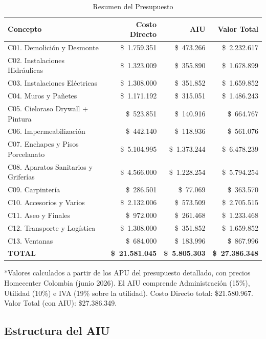 ﻿\documentclass[12pt]{article}
\begin{document}
\begin{table}[H]
\centering\footnotesize
\caption{Resumen del Presupuesto}
\label{tab:resumen}
\begin{tabular}{@{}l r r r@{}}
\toprule
\textbf{Concepto} & \textbf{Costo Directo} & \textbf{AIU} & \textbf{Valor Total} \\
\midrule
C01. Demolición y Desmonte        & \$\ 1.759.351 & \$\ 473.266 & \$\ 2.232.617 \\
C02. Instalaciones Hidráulicas    & \$\ 1.323.009 & \$\ 355.890 & \$\ 1.678.899 \\
C03. Instalaciones Eléctricas     & \$\ 1.308.000 & \$\ 351.852 & \$\ 1.659.852 \\
C04. Muros y Pañetes              & \$\ 1.171.192 & \$\ 315.051 & \$\ 1.486.243 \\
C05. Cieloraso Drywall + Pintura  & \$\ 523.851   & \$\ 140.916 & \$\ 664.767   \\
C06. Impermeabilización           & \$\ 442.140   & \$\ 118.936 & \$\ 561.076   \\
C07. Enchapes y Pisos Porcelanato & \$\ 5.104.995 & \$\ 1.373.244 & \$\ 6.478.239 \\
C08. Aparatos Sanitarios y Griferías & \$\ 4.566.000 & \$\ 1.228.254 & \$\ 5.794.254 \\
C09. Carpintería                  & \$\ 286.501   & \$\ 77.069  & \$\ 363.570   \\
C10. Accesorios y Varios          & \$\ 2.132.006 & \$\ 573.509 & \$\ 2.705.515 \\
C11. Aseo y Finales               & \$\ 972.000   & \$\ 261.468 & \$\ 1.233.468 \\
C12. Transporte y Logística       & \$\ 1.308.000 & \$\ 351.852 & \$\ 1.659.852 \\
C13. Ventanas                     & \$\ 684.000   & \$\ 183.996 & \$\ 867.996   \\
\midrule
\textbf{TOTAL} & \textbf{\$\ 21.581.045} & \textbf{\$\ 5.805.303} & \textbf{\$\ 27.386.348} \\
\bottomrule
\end{tabular}
\end{table}

\noindent
*Valores calculados a partir de los APU del presupuesto detallado, con precios Homecenter Colombia
(junio 2026). El AIU comprende Administración (15\%), Utilidad (10\%) e IVA (19\% sobre la utilidad).
Costo Directo total: \$21.580.967. Valor Total (con AIU): \$27.386.349.

\subsection{Estructura del AIU}
\end{document}
